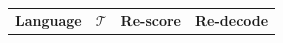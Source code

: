 \begin{table}
\centering
   \begin{tabular}{lrrrrr} \toprule
   \textbf{Language} & $\mathcal{T}$ &  \multicolumn{2}{c}{\textbf{Re-score}} & \multicolumn{2}{c}{\textbf{Re-decode}}\\ 

\end{tabular}
\end{table}
